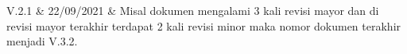 {V.2.1}					&	%
{22/09/2021}			&	%
{\noindent					%
    Misal dokumen mengalami 3 kali revisi mayor dan di revisi mayor terakhir terdapat 2 kali revisi minor maka nomor dokumen terakhir menjadi V.3.2.
}